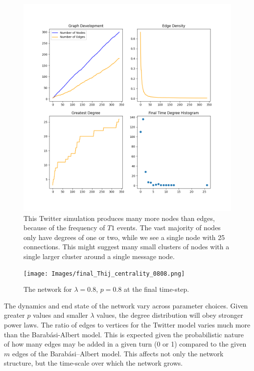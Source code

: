 \begin{figure}[h!]
    \includegraphics[width=14cm]{Images/twitter_sim_stats_3_0.8_0.8.png}
    \centering
    \caption{This Twitter simulation produces many more nodes than 
    edges, because of the frequency of $T1$ events. The vast majority of nodes only 
    have degrees of one or two, while we see a single node with 25 connections.
    This might suggest many small clusters of nodes with a single larger
    cluster around a single message node.}
\end{figure}


\begin{figure}[h!]
    \texttt{[image: Images/final\_Thij\_centrality\_0808.png]}
    \centering
    \caption{The network for $\lambda=0.8$, $p=0.8$ at the final time-step.}
\end{figure}

\clearpage

The dynamics and end state of the network vary across parameter choices.
Given greater $p$ values and smaller $\lambda$ values, the degree distribution will obey stronger
power laws. The ratio of edges to vertices for the Twitter model varies much more than the Barabási-Albert model.
This is expected given the probabilistic nature of how many edges may be added in a given turn (0 or 1) compared
to the given $m$ edges of the Barabási–Albert model. This affects not only the network structure, but the time-scale 
over which the network grows.

